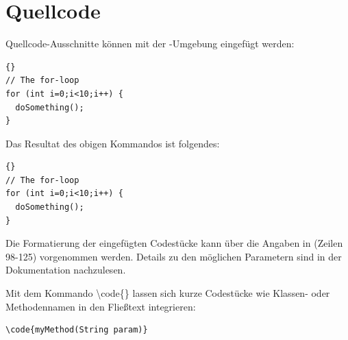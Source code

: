 \section{Quellcode}
\label{ref:quellcode}
Quellcode-Ausschnitte können mit der -Umgebung eingefügt werden:
\begin{lstlisting}[caption={\emph{A simple loop}}, label={lst:simple_loop}]{}
// The for-loop
for (int i=0;i<10;i++) {
  doSomething();
}
\end{lstlisting}
Das Resultat des obigen Kommandos ist folgendes:
\begin{lstlisting}[caption={\emph{A simple loop}}, label={lst:simple_loop}]{}
// The for-loop
for (int i=0;i<10;i++) {
  doSomething();
}
\end{lstlisting}
Die Formatierung der eingefügten Codestücke kann über die Angaben in  (Zeilen 98-125) vorgenommen werden. Details zu den möglichen Parametern sind in der Dokumentation  nachzulesen.

Mit dem Kommando \textbackslash{}code\{\} lassen sich kurze Codestücke wie Klassen- oder Methodennamen in den Fließtext integrieren:
\begin{verbatim}
\code{myMethod(String param)}
\end{verbatim}
